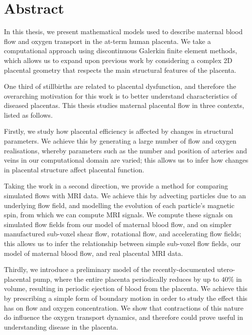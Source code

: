 \documentclass[a4paper, 12pt, oneside, colorinlistoftodos]{book}
\begin{document}
    \rfoot{\footnotesize \thepage}
    \listoftodos
    
    


    \chapter*{Abstract}
        In this thesis, we present mathematical models used to describe maternal blood flow and oxygen transport in the at-term human placenta. We take a computational approach using discontinuous Galerkin finite element methods, which allows us to expand upon previous work by considering a complex 2D placental geometry that respects the main structural features of the placenta.
        
        One third of stillbirths are related to placental dysfunction, and therefore the overarching motivation for this work is to better understand characteristics of diseased placentas. This thesis studies maternal placental flow in three contexts, listed as follows.

        Firstly, we study how placental efficiency is affected by changes in structural parameters. We achieve this by generating a large number of flow and oxygen realisations, whereby parameters such as the number and position of arteries and veins in our computational domain are varied; this allows us to infer how changes in placental structure affect placental function.

        Taking the work in a second direction, we provide a method for comparing simulated flows with MRI data. We achieve this by advecting particles due to an underlying flow field, and modelling the evolution of each particle's magnetic spin, from which we can compute MRI signals. We compute these signals on simulated flow fields from our model of maternal blood flow, and on simpler manufactured sub-voxel shear flow, rotational flow, and accelerating flow fields; this allows us to infer the relationship between simple sub-voxel flow fields, our model of maternal blood flow, and real placental MRI data.

        Thirdly, we introduce a preliminary model of the recently-documented utero-placental pump, where the entire placenta periodically reduces by up to $40\%$ in volume, resulting in periodic ejection of blood from the placenta. We achieve this by prescribing a simple form of boundary motion in order to study the effect this has on flow and oxygen concentration. We show that contractions of this nature do influence the oxygen transport dynamics, and therefore could prove useful in understanding disease in the placenta.
\end{document}
